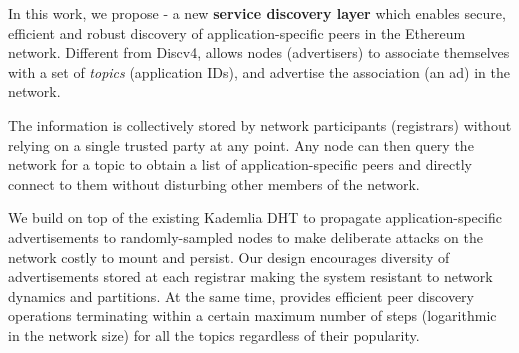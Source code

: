 

 In this work, we propose \sysname - a new \textbf{service discovery layer} which enables secure,  efficient and robust discovery of application-specific peers in the Ethereum network.
Different from Discv4, \sysname allows nodes (\ie advertisers) to associate themselves with a set of \emph{topics} (\eg application IDs), and advertise the association (\ie an ad) in the network. 

The information is collectively stored by network participants (\ie registrars) without relying on a single trusted party at any point. Any node can then query the network for a topic to obtain a list of application-specific peers and directly connect to them without disturbing other members of the network. 

We build \sysname on top of the existing Kademlia DHT to propagate application-specific advertisements to randomly-sampled nodes to make deliberate attacks on the network costly to mount and persist. Our design encourages diversity of advertisements stored at each registrar making the system resistant to network dynamics and partitions. At the same time, \sysname provides efficient peer discovery operations terminating within a certain maximum number of steps (logarithmic in the network size) for all the topics regardless of their popularity. 

